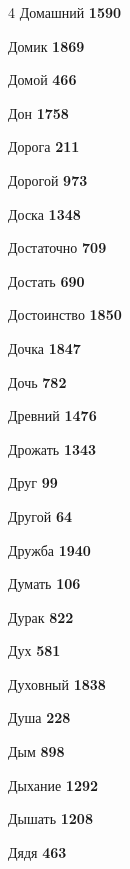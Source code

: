 \begin{multicols}{4}
\noindent Домашний \dotfill \textbf{\color{secondary} 1590}\par
\noindent Домик \dotfill \textbf{\color{secondary} 1869}\par
\noindent Домой \dotfill \textbf{\color{secondary} 466}\par
\noindent Дон \dotfill \textbf{\color{secondary} 1758}\par
\noindent Дорога \dotfill \textbf{\color{secondary} 211}\par
\noindent Дорогой \dotfill \textbf{\color{secondary} 973}\par
\noindent Доска \dotfill \textbf{\color{secondary} 1348}\par
\noindent Достаточно \dotfill \textbf{\color{secondary} 709}\par
\noindent Достать \dotfill \textbf{\color{secondary} 690}\par
\noindent Достоинство \dotfill \textbf{\color{secondary} 1850}\par
\noindent Дочка \dotfill \textbf{\color{secondary} 1847}\par
\noindent Дочь \dotfill \textbf{\color{secondary} 782}\par
\noindent Древний \dotfill \textbf{\color{secondary} 1476}\par
\noindent Дрожать \dotfill \textbf{\color{secondary} 1343}\par
\noindent Друг \dotfill \textbf{\color{secondary} 99}\par
\noindent Другой \dotfill \textbf{\color{secondary} 64}\par
\noindent Дружба \dotfill \textbf{\color{secondary} 1940}\par
\noindent Думать \dotfill \textbf{\color{secondary} 106}\par
\noindent Дурак \dotfill \textbf{\color{secondary} 822}\par
\noindent Дух \dotfill \textbf{\color{secondary} 581}\par
\noindent Духовный \dotfill \textbf{\color{secondary} 1838}\par
\noindent Душа \dotfill \textbf{\color{secondary} 228}\par
\noindent Дым \dotfill \textbf{\color{secondary} 898}\par
\noindent Дыхание \dotfill \textbf{\color{secondary} 1292}\par
\noindent Дышать \dotfill \textbf{\color{secondary} 1208}\par
\noindent Дядя \dotfill \textbf{\color{secondary} 463}\par


\end{multicols}
